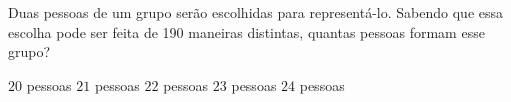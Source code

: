 Duas pessoas de um grupo serão escolhidas para representá-lo. Sabendo que essa escolha pode ser feita de 190 maneiras distintas, quantas pessoas formam esse grupo?

$20$ pessoas
$21$ pessoas
$22$ pessoas
$23$ pessoas
$24$ pessoas




